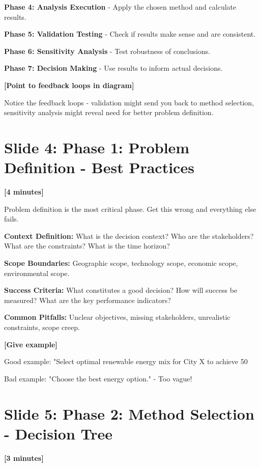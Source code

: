 \documentclass[12pt]{article}
\begin{document}
\textcolor{emphasis}{\textbf{Phase 4: Analysis Execution}} - Apply the chosen method and calculate results.

\textcolor{emphasis}{\textbf{Phase 5: Validation Testing}} - Check if results make sense and are consistent.

\textcolor{emphasis}{\textbf{Phase 6: Sensitivity Analysis}} - Test robustness of conclusions.

\textcolor{emphasis}{\textbf{Phase 7: Decision Making}} - Use results to inform actual decisions.

\textcolor{speakernote}{\textbf{[Point to feedback loops in diagram]}}

Notice the feedback loops - validation might send you back to method selection, sensitivity analysis might reveal need for better problem definition.

\section*{Slide 4: Phase 1: Problem Definition - Best Practices}
\textcolor{timing}{\textbf{[4 minutes]}}

Problem definition is the most critical phase. Get this wrong and everything else fails.

\textcolor{emphasis}{\textbf{Context Definition:}} What is the decision context? Who are the stakeholders? What are the constraints? What is the time horizon?

\textcolor{emphasis}{\textbf{Scope Boundaries:}} Geographic scope, technology scope, economic scope, environmental scope.

\textcolor{emphasis}{\textbf{Success Criteria:}} What constitutes a good decision? How will success be measured? What are the key performance indicators?

\textcolor{emphasis}{\textbf{Common Pitfalls:}} Unclear objectives, missing stakeholders, unrealistic constraints, scope creep.

\textcolor{speakernote}{\textbf{[Give example]}}

Good example: "Select optimal renewable energy mix for City X to achieve 50%

Bad example: "Choose the best energy option." - Too vague!

\section*{Slide 5: Phase 2: Method Selection - Decision Tree}
\textcolor{timing}{\textbf{[3 minutes]}}
\end{document}
